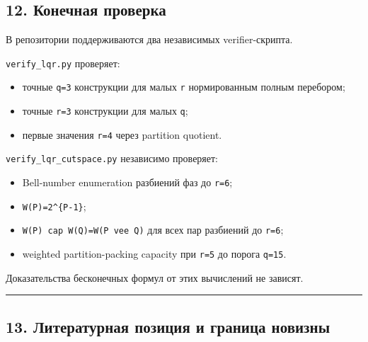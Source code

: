 \hypertarget{ux43aux43eux43dux435ux447ux43dux430ux44f-ux43fux440ux43eux432ux435ux440ux43aux430}{%
\subsection{12. Конечная
проверка}\label{ux43aux43eux43dux435ux447ux43dux430ux44f-ux43fux440ux43eux432ux435ux440ux43aux430}}

В репозитории поддерживаются два независимых verifier-скрипта.

\texttt{verify\_lqr.py} проверяет:

\begin{itemize}
\tightlist
\item
  точные \texttt{q=3} конструкции для малых \texttt{r} нормированным
  полным перебором;
\item
  точные \texttt{r=3} конструкции для малых \texttt{q};
\item
  первые значения \texttt{r=4} через partition quotient.
\end{itemize}

\texttt{verify\_lqr\_cutspace.py} независимо проверяет:

\begin{itemize}
\tightlist
\item
  Bell-number enumeration разбиений фаз до \texttt{r=6};
\item
  \texttt{\textbar{}W(P)\textbar{}=2\^{}\{\textbar{}P\textbar{}-1\}};
\item
  \texttt{W(P)\ cap\ W(Q)=W(P\ vee\ Q)} для всех пар разбиений до
  \texttt{r=6};
\item
  weighted partition-packing capacity при \texttt{r=5} до порога
  \texttt{q=15}.
\end{itemize}

Доказательства бесконечных формул от этих вычислений не зависят.

\begin{center}\rule{0.5\linewidth}{0.5pt}\end{center}

\hypertarget{ux43bux438ux442ux435ux440ux430ux442ux443ux440ux43dux430ux44f-ux43fux43eux437ux438ux446ux438ux44f-ux438-ux433ux440ux430ux43dux438ux446ux430-ux43dux43eux432ux438ux437ux43dux44b}{%
\subsection{13. Литературная позиция и граница
новизны}\label{ux43bux438ux442ux435ux440ux430ux442ux443ux440ux43dux430ux44f-ux43fux43eux437ux438ux446ux438ux44f-ux438-ux433ux440ux430ux43dux438ux446ux430-ux43dux43eux432ux438ux437ux43dux44b}}

